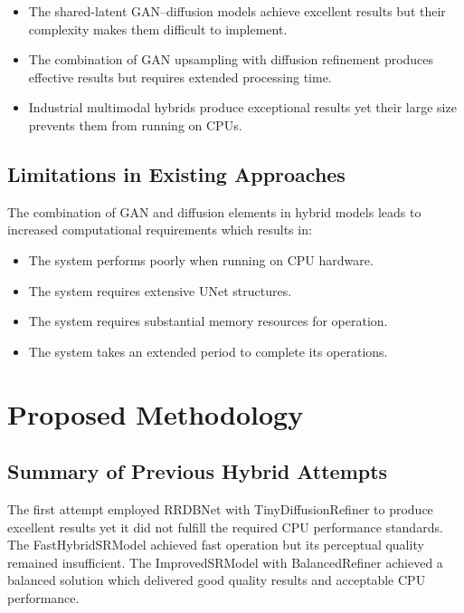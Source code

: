 \documentclass[conference]{IEEEtran}
\begin{document}
\begin{itemize}
    \item The shared-latent GAN--diffusion models achieve excellent results but their complexity makes them difficult to implement.
    \item The combination of GAN upsampling with diffusion refinement produces effective results but requires extended processing time.
    \item Industrial multimodal hybrids produce exceptional results yet their large size prevents them from running on CPUs.
\end{itemize}

\subsection{Limitations in Existing Approaches}
The combination of GAN and diffusion elements in hybrid models leads to increased computational requirements which results in:

\begin{itemize}
    \item The system performs poorly when running on CPU hardware.
    \item The system requires extensive UNet structures.
    \item The system requires substantial memory resources for operation.
    \item The system takes an extended period to complete its operations.
\end{itemize}

\section{Proposed Methodology}

\subsection{Summary of Previous Hybrid Attempts}
The first attempt employed RRDBNet with TinyDiffusionRefiner to produce excellent results yet it did not fulfill the required CPU performance standards. The FastHybridSRModel achieved fast operation but its perceptual quality remained insufficient. The ImprovedSRModel with BalancedRefiner achieved a balanced solution which delivered good quality results and acceptable CPU performance.
\end{document}
